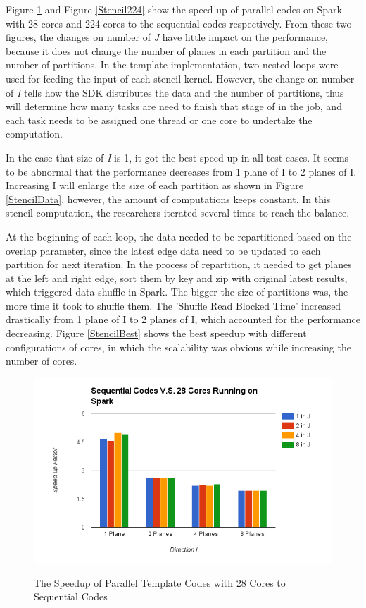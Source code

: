 Figure \ref{Stencil28} and Figure \ref{Stencil224} show the speed up of parallel codes on Spark with 28 cores and 224 cores to the sequential codes respectively. 
From these two figures, the changes on number of \emph{J} have little impact on the performance, because it does not change the number of planes in each partition and the number of partitions. In the template implementation, two nested loops were used for feeding the input of each stencil kernel. However, the change on number of \emph{I} tells how the SDK distributes the data and the number of partitions, thus will determine how many tasks are need to finish that stage of in the job, and each task needs to be assigned one thread or one core to undertake the computation.

In the case that size of \emph{I} is 1, it got the best speed up in all test cases. It seems to be abnormal that the performance decreases from 1 plane of I to 2 planes of I. Increasing I will enlarge the size of each partition as shown in Figure \ref{StencilData}, however, the amount of computations keeps constant. In this stencil computation, the researchers iterated several times to reach the balance. 

At the beginning of each loop, the data needed to be repartitioned based on the overlap parameter, since the latest edge data need to be updated to each partition for next iteration. In the process of repartition, it needed to get planes at the left and right edge, sort them by key and zip with original latest results, which triggered data shuffle in Spark. The bigger the size of partitions was, the more time it took to shuffle them. The 'Shuffle Read Blocked Time' increased drastically from 1 plane of I to 2 planes of I, which accounted for the performance decreasing. 
Figure \ref{StencilBest} shows the best speedup with different configurations of cores, in which the scalability was obvious while increasing the number of cores.

\begin{figure}[h]
\centering
\includegraphics[scale=0.7]{figures/Stencil28.png}\\
\caption{The Speedup of Parallel Template Codes with 28 Cores to Sequential Codes}
\label{Stencil28}
\end{figure}

